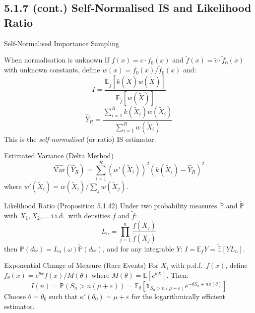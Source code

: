\documentclass[aspectratio=169,10pt]{beamer}
\begin{document}
\subsection{5.1.7 (cont.) Self-Normalised IS and Likelihood Ratio}

\begin{frame}[allowframebreaks]{Self-Normalised Importance Sampling}

  \begin{block}{When normalisation is unknown}
    If $f(x) = c \cdot f_0(x)$ and $\tilde{f}(x) = \tilde{c} \cdot \tilde{f}_0(x)$
    with unknown constants, define $w(x) = f_0(x)/\tilde{f}_0(x)$ and:
    \[
      I = \frac{\mathbb{E}_{\tilde{f}}[k(\tilde{X})w(\tilde{X})]}
               {\mathbb{E}_{\tilde{f}}[w(\tilde{X})]}
    \]
    \[
      \hat{Y}_R = \frac{\sum_{i=1}^R k(\tilde{X}_i)w(\tilde{X}_i)}
                       {\sum_{i=1}^R w(\tilde{X}_i)}
    \]
    This is the \emph{self-normalised} (or ratio) IS estimator.
  \end{block}

  \begin{block}{Estimated Variance (Delta Method)}
    \[
      \widehat{\mathrm{Var}}(\hat{Y}_R) = \sum_{i=1}^R (w'(\tilde{X}_i))^2
      (k(\tilde{X}_i) - \hat{Y}_R)^2
    \]
    where $w'(\tilde{X}_i) = w(\tilde{X}_i)/\sum_j w(\tilde{X}_j)$.
  \end{block}

  \framebreak

  \begin{block}{Likelihood Ratio (Proposition 5.1.42)}
    Under two probability measures $\mathbb{P}$ and $\tilde{\mathbb{P}}$ with
    $X_1, X_2, \ldots$ i.i.d.\ with densities $f$ and $\tilde{f}$:
    \[
      L_n = \prod_{j=1}^n \frac{f(X_j)}{\tilde{f}(X_j)}
    \]
    then $\mathbb{P}(d\omega) = L_n(\omega)\tilde{\mathbb{P}}(d\omega)$, and
    for any integrable $Y$: $I = \mathbb{E}_f Y = \tilde{\mathbb{E}}[Y L_n]$.
  \end{block}

  \begin{block}{Exponential Change of Measure (Rare Events)}
    For $X_i$ with p.d.f.\ $f(x)$, define $f_\theta(x) = e^{\theta x}f(x)/M(\theta)$
    where $M(\theta) = \mathbb{E}[e^{\theta X}]$. Then:
    \[
      I(n) = \mathbb{P}(S_n > n(\mu+\varepsilon))
           = \mathbb{E}_\theta\!\left[\mathbf{1}_{S_n > n(\mu+\varepsilon)}
             e^{-\theta S_n + n\kappa(\theta)}\right]
    \]
    Choose $\theta = \theta_0$ such that $\kappa'(\theta_0) = \mu + \varepsilon$
    for the logarithmically efficient estimator.
  \end{block}

\end{frame}
\end{document}
